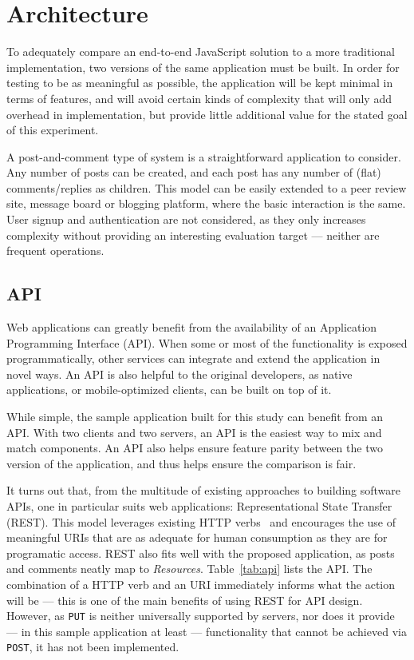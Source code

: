 \section{\label{sec:arch}Architecture}

To adequately compare an end-to-end JavaScript solution to a more traditional implementation, two versions of the same application must be built. In order for testing to be as meaningful as possible, the application will be kept minimal in terms of features, and will avoid certain kinds of complexity that will only add overhead in implementation, but provide little additional value for the stated goal of this experiment.

A post-and-comment type of system is a straightforward application to consider. Any number of posts can be created, and each post has any number of (flat) comments/replies as children. This model can be easily extended to a peer review site, message board or blogging platform, where the basic interaction is the same. User signup and authentication are not considered, as they only increases complexity without providing an interesting evaluation target --- neither are frequent operations.

\subsection{\label{sec:arch:API}API}

Web applications can greatly benefit from the availability of an Application Programming Interface (API). When some or most of the functionality is exposed programmatically, other services can integrate and extend the application in novel ways. An API is also helpful to the original developers, as native applications, or mobile-optimized clients, can be built on top of it.

While simple, the sample application built for this study can benefit from an API. With two clients and two servers, an API is the easiest way to mix and match components. An API also helps ensure feature parity between the two version of the application, and thus helps ensure the comparison is fair.

It turns out that, from the multitude of existing approaches to building software APIs, one in particular suits web applications: Representational State Transfer~\cite{restful} (REST). This model leverages existing HTTP verbs~\cite{rfc2616} and encourages the use of meaningful URIs that are as adequate for human consumption as they are for programatic access. REST also fits well with the proposed application, as posts and comments neatly map to \emph{Resources}. Table~\ref{tab:api} lists the API. The combination of a HTTP verb and an URI immediately informs what the action will be --- this is one of the main benefits of using REST for API design. However, as \texttt{PUT} is neither universally supported by servers, nor does it provide --- in this sample application at least --- functionality that cannot be achieved via \texttt{POST}, it has not been implemented.

